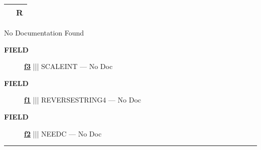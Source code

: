 {\renewcommand{\arraystretch}{1.5}
\begin{tabularx}{\textwidth}{|>{\raggedright\arraybackslash}l|X|}
\hline
\hspace{0pt}\mytexttt{\color{red} } & \textbf{R} \\
\hline
\end{tabularx}
}

\par





No Documentation Found







\par
\begin{description}
\item [\colorbox{tagtype}{\color{white} \textbf{\textsf{FIELD}}}] \textbf{\underline{f3}} ||| SCALEINT --- No Doc
\item [\colorbox{tagtype}{\color{white} \textbf{\textsf{FIELD}}}] \textbf{\underline{f1}} ||| REVERSESTRING4 --- No Doc
\item [\colorbox{tagtype}{\color{white} \textbf{\textsf{FIELD}}}] \textbf{\underline{f2}} ||| NEEDC --- No Doc
\end{description}





\rule{\linewidth}{0.5pt}


